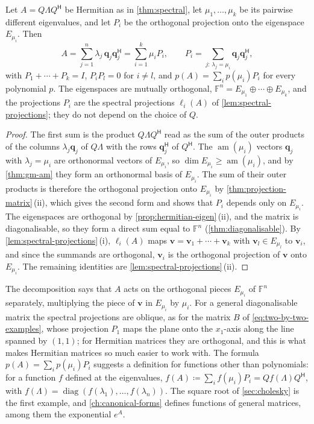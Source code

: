 \begin{proposition}
\label{prop:spectral-decomposition}
Let $A=Q\Lambda Q^{\mathsf H}$ be Hermitian as in \cref{thm:spectral}, let $\mu_1,\ldots,\mu_k$ be its pairwise different eigenvalues, and let $P_i$ be the orthogonal projection onto the eigenspace $E_{\mu_i}$. Then
\[
A=\sum_{j=1}^n\lambda_j\,\mathbf q_j\mathbf q_j^{\mathsf H}=\sum_{i=1}^k\mu_iP_i,\qquad P_i=\sum_{j:\,\lambda_j=\mu_i}\mathbf q_j\mathbf q_j^{\mathsf H},
\]
with $P_1+\cdots+P_k=I$, $P_iP_l=0$ for $i\ne l$, and $p(A)=\sum_ip(\mu_i)P_i$ for every polynomial $p$. The eigenspaces are mutually orthogonal, $\mathbb F^n=E_{\mu_1}\oplus\cdots\oplus E_{\mu_k}$, and the projections $P_i$ are the spectral projections $\ell_i(A)$ of \cref{lem:spectral-projections}; they do not depend on the choice of $Q$.
\end{proposition}

\begin{proof}
The first sum is the product $Q\Lambda Q^{\mathsf H}$ read as the sum of the outer products of the columns $\lambda_j\mathbf q_j$ of $Q\Lambda$ with the rows $\mathbf q_j^{\mathsf H}$ of $Q^{\mathsf H}$. The $\operatorname{am}(\mu_i)$ vectors $\mathbf q_j$ with $\lambda_j=\mu_i$ are orthonormal vectors of $E_{\mu_i}$, so $\dim E_{\mu_i}\ge\operatorname{am}(\mu_i)$, and by \cref{thm:gm-am} they form an orthonormal basis of $E_{\mu_i}$. The sum of their outer products is therefore the orthogonal projection onto $E_{\mu_i}$ by \cref{thm:projection-matrix}\,(ii), which gives the second form and shows that $P_i$ depends only on $E_{\mu_i}$. The eigenspaces are orthogonal by \cref{prop:hermitian-eigen}\,(ii), and the matrix is diagonalisable, so they form a direct sum equal to $\mathbb F^n$ (\cref{thm:diagonalisable}). By \cref{lem:spectral-projections}\,(i), $\ell_i(A)$ maps $\mathbf v=\mathbf v_1+\cdots+\mathbf v_k$ with $\mathbf v_l\in E_{\mu_l}$ to $\mathbf v_i$, and since the summands are orthogonal, $\mathbf v_i$ is the orthogonal projection of $\mathbf v$ onto $E_{\mu_i}$. The remaining identities are \cref{lem:spectral-projections}\,(ii).
\end{proof}

The decomposition says that $A$ acts on the orthogonal pieces $E_{\mu_i}$ of $\mathbb F^n$ separately, multiplying the piece of $\mathbf v$ in $E_{\mu_i}$ by $\mu_i$. For a general diagonalisable matrix the spectral projections are oblique, as for the matrix $B$ of \eqref{eq:two-by-two-examples}, whose projection $P_1$ maps the plane onto the $x_1$-axis along the line spanned by $(1,1)$; for Hermitian matrices they are orthogonal, and this is what makes Hermitian matrices so much easier to work with. The formula $p(A)=\sum_ip(\mu_i)P_i$ suggests a definition for functions other than polynomials: for a function $f$ defined at the eigenvalues, $f(A)\coloneqq\sum_if(\mu_i)P_i=Qf(\Lambda)Q^{\mathsf H}$, with $f(\Lambda)=\operatorname{diag}(f(\lambda_1),\ldots,f(\lambda_n))$. The square root of \cref{sec:cholesky} is the first example, and \cref{ch:canonical-forms} defines functions of general matrices, among them the exponential $e^A$.

